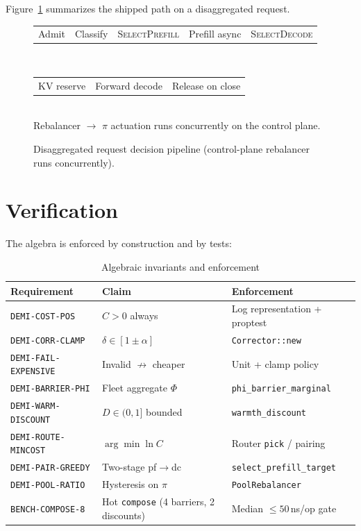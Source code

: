 \documentclass[11pt,a4paper]{article}
\begin{document}
Figure~\ref{fig:pipeline} summarizes the shipped path on a disaggregated request.

\begin{figure}[ht]
  \centering
  \small
  \begin{tabular}{@{}c@{\ $\to$\ }c@{\ $\to$\ }c@{\ $\to$\ }c@{\ $\to$\ }c@{}}
    Admit & Classify & \textsc{SelectPrefill} & Prefill async &
    \textsc{SelectDecode} \\
  \end{tabular}\\[0.6em]
  \begin{tabular}{@{}c@{\ $\to$\ }c@{\ $\to$\ }c@{}}
    KV reserve & Forward decode & Release on close
  \end{tabular}\\[0.4em]
  {\small Rebalancer $\to$ $\pi$ actuation runs concurrently on the control plane.}
  \caption{Disaggregated request decision pipeline (control-plane rebalancer runs concurrently).}
  \label{fig:pipeline}
\end{figure}

\section{Verification}

The algebra is enforced by construction and by tests:

\begin{table}[h]
  \centering
  \caption{Algebraic invariants and enforcement}
  \label{tab:verify}
  \begin{tabular}{@{}lll@{}}
    \toprule
    Requirement & Claim & Enforcement \\
    \midrule
    \texttt{DEMI-COST-POS} & $C > 0$ always & Log representation + proptest \\
    \texttt{DEMI-CORR-CLAMP} & $\delta \in [1\!\pm\!\alpha]$ & \texttt{Corrector::new} \\
    \texttt{DEMI-FAIL-EXPENSIVE} & Invalid $\not\to$ cheaper & Unit + clamp policy \\
    \texttt{DEMI-BARRIER-PHI} & Fleet aggregate $\Phi$ & \texttt{phi\_barrier\_marginal} \\
    \texttt{DEMI-WARM-DISCOUNT} & $D \in (0,1]$ bounded & \texttt{warmth\_discount} \\
    \texttt{DEMI-ROUTE-MINCOST} & $\arg\min \ln C$ & Router \texttt{pick} / pairing \\
    \texttt{DEMI-PAIR-GREEDY} & Two-stage pf$\to$dc & \texttt{select\_prefill\_target} \\
    \texttt{DEMI-POOL-RATIO} & Hysteresis on $\pi$ & \texttt{PoolRebalancer} \\
    \texttt{BENCH-COMPOSE-8} & Hot \texttt{compose} (4 barriers, 2 discounts) & Median $\le 50$\,ns/op gate \\
    \bottomrule
  \end{tabular}
\end{table}
\end{document}
